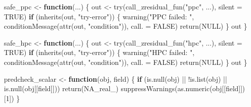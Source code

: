 \documentclass[
  english,
  letterpaper,
  DIV=11,
  numbers=noendperiod]{scrartcl}
\newenvironment{Shaded}{\begin{snugshade}}{\end{snugshade}}
\newcommand{\AttributeTok}[1]{\textcolor[rgb]{0.40,0.45,0.13}{#1}}
\newcommand{\ConstantTok}[1]{\textcolor[rgb]{0.56,0.35,0.01}{#1}}
\newcommand{\ControlFlowTok}[1]{\textcolor[rgb]{0.00,0.23,0.31}{\textbf{#1}}}
\newcommand{\DecValTok}[1]{\textcolor[rgb]{0.68,0.00,0.00}{#1}}
\newcommand{\FunctionTok}[1]{\textcolor[rgb]{0.28,0.35,0.67}{#1}}
\newcommand{\NormalTok}[1]{\textcolor[rgb]{0.00,0.23,0.31}{#1}}
\newcommand{\OtherTok}[1]{\textcolor[rgb]{0.00,0.23,0.31}{#1}}
\newcommand{\SpecialCharTok}[1]{\textcolor[rgb]{0.37,0.37,0.37}{#1}}
\newcommand{\StringTok}[1]{\textcolor[rgb]{0.13,0.47,0.30}{#1}}
\begin{document}
\begin{Shaded}
\begin{Highlighting}[]
\NormalTok{safe\_ppc }\OtherTok{\textless{}{-}} \ControlFlowTok{function}\NormalTok{(...) \{}
\NormalTok{  out }\OtherTok{\textless{}{-}} \FunctionTok{try}\NormalTok{(}\FunctionTok{call\_zresidual\_fun}\NormalTok{(}\StringTok{"ppc"}\NormalTok{, ...), }\AttributeTok{silent =} \ConstantTok{TRUE}\NormalTok{)}
  \ControlFlowTok{if}\NormalTok{ (}\FunctionTok{inherits}\NormalTok{(out, }\StringTok{"try{-}error"}\NormalTok{)) \{}
    \FunctionTok{warning}\NormalTok{(}\StringTok{"PPC failed: "}\NormalTok{, }\FunctionTok{conditionMessage}\NormalTok{(}\FunctionTok{attr}\NormalTok{(out, }\StringTok{"condition"}\NormalTok{)), }\AttributeTok{call. =} \ConstantTok{FALSE}\NormalTok{)}
    \FunctionTok{return}\NormalTok{(}\ConstantTok{NULL}\NormalTok{)}
\NormalTok{  \}}
\NormalTok{  out}
\NormalTok{\}}

\NormalTok{safe\_hpc }\OtherTok{\textless{}{-}} \ControlFlowTok{function}\NormalTok{(...) \{}
\NormalTok{  out }\OtherTok{\textless{}{-}} \FunctionTok{try}\NormalTok{(}\FunctionTok{call\_zresidual\_fun}\NormalTok{(}\StringTok{"hpc"}\NormalTok{, ...), }\AttributeTok{silent =} \ConstantTok{TRUE}\NormalTok{)}
  \ControlFlowTok{if}\NormalTok{ (}\FunctionTok{inherits}\NormalTok{(out, }\StringTok{"try{-}error"}\NormalTok{)) \{}
    \FunctionTok{warning}\NormalTok{(}\StringTok{"HPC failed: "}\NormalTok{, }\FunctionTok{conditionMessage}\NormalTok{(}\FunctionTok{attr}\NormalTok{(out, }\StringTok{"condition"}\NormalTok{)), }\AttributeTok{call. =} \ConstantTok{FALSE}\NormalTok{)}
    \FunctionTok{return}\NormalTok{(}\ConstantTok{NULL}\NormalTok{)}
\NormalTok{  \}}
\NormalTok{  out}
\NormalTok{\}}

\NormalTok{predcheck\_scalar }\OtherTok{\textless{}{-}} \ControlFlowTok{function}\NormalTok{(obj, field) \{}
  \ControlFlowTok{if}\NormalTok{ (}\FunctionTok{is.null}\NormalTok{(obj) }\SpecialCharTok{||} \SpecialCharTok{!}\FunctionTok{is.list}\NormalTok{(obj) }\SpecialCharTok{||} \FunctionTok{is.null}\NormalTok{(obj[[field]])) }\FunctionTok{return}\NormalTok{(}\ConstantTok{NA\_real\_}\NormalTok{)}
  \FunctionTok{suppressWarnings}\NormalTok{(}\FunctionTok{as.numeric}\NormalTok{(obj[[field]])[}\DecValTok{1}\NormalTok{])}
\NormalTok{\}}


\end{Highlighting}
\end{Shaded}
\end{document}

